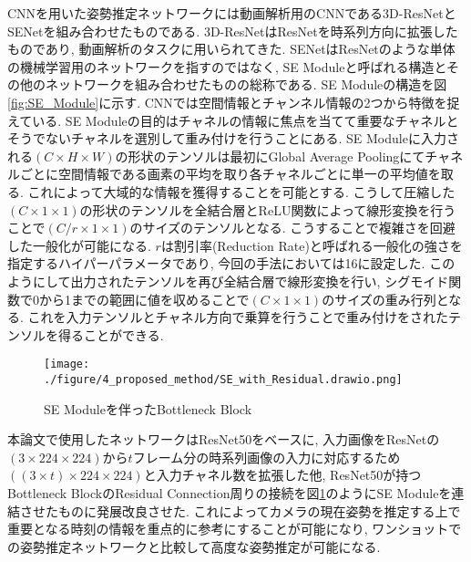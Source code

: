 CNNを用いた姿勢推定ネットワークには動画解析用のCNNである3D-ResNet\cite{3D-ResNet_paper}とSENet\cite{SENet_paper}を組み合わせたものである. 3D-ResNetはResNet\cite{ResNet_paper}を時系列方向に拡張したものであり, 動画解析のタスクに用いられてきた. SENetはResNetのような単体の機械学習用のネットワークを指すのではなく, SE Moduleと呼ばれる構造とその他のネットワークを組み合わせたものの総称である. SE Moduleの構造を図\ref{fig:SE_Module}に示す. CNNでは空間情報とチャンネル情報の2つから特徴を捉えている. SE Moduleの目的はチャネルの情報に焦点を当てて重要なチャネルとそうでないチャネルを選別して重み付けを行うことにある. SE Moduleに入力される$(C \times H \times W)$の形状のテンソルは最初にGlobal Average Pooling\cite{GAP_paper}にてチャネルごとに空間情報である画素の平均を取り各チャネルごとに単一の平均値を取る. これによって大域的な情報を獲得することを可能とする. こうして圧縮した$(C \times 1 \times 1)$の形状のテンソルを全結合層とReLU\cite{ReLU_paper}関数によって線形変換を行うことで$(C/r \times 1 \times 1)$のサイズのテンソルとなる. こうすることで複雑さを回避した一般化が可能になる. $r$は割引率(Reduction Rate)と呼ばれる一般化の強さを指定するハイパーパラメータであり, 今回の手法においては16に設定した. このようにして出力されたテンソルを再び全結合層で線形変換を行い, シグモイド関数で0から1までの範囲に値を収めることで$(C \times 1 \times 1)$のサイズの重み行列となる. これを入力テンソルとチャネル方向で乗算を行うことで重み付けをされたテンソルを得ることができる.

\begin{figure}[thpb]
  \begin{minipage}[htpb]{1.0\hsize}
  \begin{center}
  \texttt{[image: ./figure/4\_proposed\_method/SE\_with\_Residual.drawio.png]}
  \caption{SE Moduleを伴ったBottleneck Block}
  \label{fig:Bottleneck_Block}
  \end{center}
  \end{minipage}
\end{figure}

本論文で使用したネットワークはResNet50\cite{ResNet_paper}をベースに, 入力画像をResNetの$(3 \times 224 \times 224)$から$t$フレーム分の時系列画像の入力に対応するため$((3 \times t) \times 224 \times 224)$と入力チャネル数を拡張した他, ResNet50が持つBottleneck BlockのResidual Connection周りの接続を図\ref{fig:Bottleneck_Block}のようにSE Moduleを連結させたものに発展改良させた. これによってカメラの現在姿勢を推定する上で重要となる時刻の情報を重点的に参考にすることが可能になり, ワンショットでの姿勢推定ネットワークと比較して高度な姿勢推定が可能になる.


